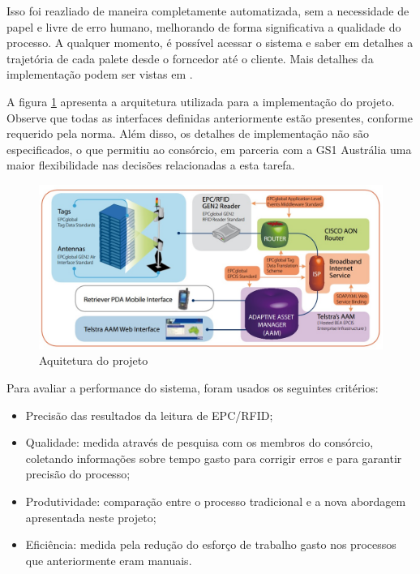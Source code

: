 \documentclass[a4paper,12pt,titlepage]{article}
\begin{document}
	Isso foi reazliado de maneira completamente automatizada, sem a necessidade de papel e livre de erro humano, melhorando de forma significativa a qualidade do processo. A qualquer momento, é possível acessar o sistema e saber em detalhes a trajetória de cada palete desde o forncedor até o cliente. Mais detalhes da implementação podem ser vistas em \cite{case_epc_demo_ext}.
	
	
	A figura \ref{fig:ausarq} apresenta a arquitetura utilizada para a implementação do projeto. Observe que todas as interfaces definidas anteriormente estão presentes, conforme requerido pela norma. Além disso, os detalhes de implementação não são especificados, o que permitiu ao consórcio, em parceria com a GS1 Austrália uma maior flexibilidade nas decisões relacionadas a esta tarefa.
	
	\begin{figure}[h!]
		\centering
		\includegraphics[width=0.7\linewidth]{ausarq}
		\caption{Aquitetura do projeto}
		\label{fig:ausarq}
	\end{figure}
	
	Para avaliar a performance do sistema, foram usados os seguintes critérios:
	\begin{itemize}
		\item Precisão das resultados da leitura de EPC/RFID;
		\item Qualidade: medida através de pesquisa com os membros do consórcio, coletando informações sobre tempo gasto para corrigir erros e para garantir precisão do processo;
		\item Produtividade: comparação entre o processo tradicional e a nova abordagem apresentada neste projeto;
		\item Eficiência: medida pela redução do esforço de trabalho gasto nos processos que anteriormente eram manuais.
	\end{itemize}
	
\end{document}
